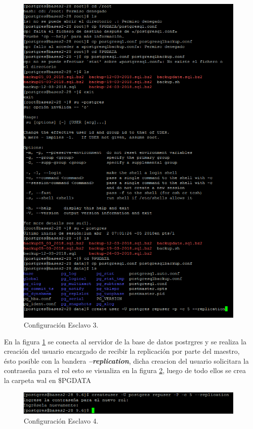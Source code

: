 \begin{figure}[H]
\centering
\includegraphics[width=\columnwidth]{eRelatedWorks/src/Captura3}
\caption{Configuración Esclavo 3. }\label{figC:3}
\end{figure}

En la figura \ref{figC:3} se conecta al servidor de la base de datos postrgres y se realiza la creación del usuario encargado de recibir la replicación por parte del maestro, ésto posible con la bandera \textbf{\textit{--replication}}, dicha creacion del usuario solicitara la contraseña para el rol esto se visualiza en la figura \ref{figC:4}, luego de todo ellos se crea la carpeta wal en \$PGDATA

\begin{figure}[H]
\centering
\includegraphics[width=\columnwidth]{eRelatedWorks/src/Captura4}
\caption{Configuración Esclavo 4. }\label{figC:4}
\end{figure}

